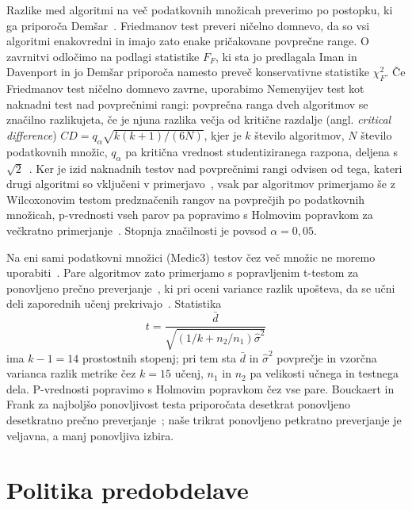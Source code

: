 \documentclass[a4paper,12pt,openright]{book}
\begin{document}
Razlike med algoritmi na več podatkovnih množicah preverimo po postopku, ki ga
priporoča Demšar~\cite{demsar2006statistical}. Friedmanov test preveri ničelno
domnevo, da so vsi algoritmi enakovredni in imajo zato enake pričakovane
povprečne range. O zavrnitvi odločimo na podlagi statistike $F_F$, ki sta jo
predlagala Iman in Davenport in jo Demšar priporoča namesto preveč
konservativne statistike $\chi^2_F$. Če Friedmanov test ničelno domnevo zavrne,
uporabimo Nemenyijev test kot naknadni test nad povprečnimi rangi: povprečna
ranga dveh algoritmov se značilno razlikujeta, če je njuna razlika večja od
kritične razdalje (angl. \emph{critical difference})
$\mathit{CD} = q_\alpha \sqrt{k(k+1)/(6N)}$, kjer je $k$ število algoritmov,
$N$ število podatkovnih množic, $q_\alpha$ pa kritična vrednost
studentiziranega razpona, deljena s $\sqrt{2}$~\cite{demsar2006statistical}.
Ker je izid naknadnih testov nad povprečnimi rangi odvisen od tega, kateri
drugi algoritmi so vključeni v primerjavo~\cite{benavoli2016should}, vsak par
algoritmov primerjamo še z Wilcoxonovim testom predznačenih rangov na
povprečjih po podatkovnih množicah, p-vrednosti vseh parov pa popravimo s
Holmovim popravkom za večkratno primerjanje~\cite{demsar2006statistical}.
Stopnja značilnosti je povsod $\alpha = 0{,}05$.

Na eni sami podatkovni množici (Medic3) testov čez več množic ne moremo
uporabiti~\cite{demsar2006statistical}. Pare algoritmov zato primerjamo s
popravljenim t-testom za ponovljeno prečno
preverjanje~\cite{bouckaert2004evaluating}, ki pri oceni variance razlik
upošteva, da se učni deli zaporednih učenj prekrivajo~\cite{nadeau2003inference}.
Statistika
\[
t = \frac{\bar{d}}{\sqrt{\left(1/k + n_2/n_1\right)\hat{\sigma}^2}}
\]
ima $k - 1 = 14$ prostostnih stopenj; pri tem sta $\bar{d}$ in $\hat{\sigma}^2$
povprečje in vzorčna varianca razlik metrike čez $k = 15$ učenj, $n_1$ in $n_2$
pa velikosti učnega in testnega dela. P-vrednosti popravimo s Holmovim
popravkom čez vse pare. Bouckaert in Frank za najboljšo ponovljivost testa
priporočata desetkrat ponovljeno desetkratno prečno
preverjanje~\cite{bouckaert2004evaluating}; naše trikrat ponovljeno petkratno
preverjanje je veljavna, a manj ponovljiva izbira.

\section{Politika predobdelave}
\label{sec:predobdelava}
\end{document}
